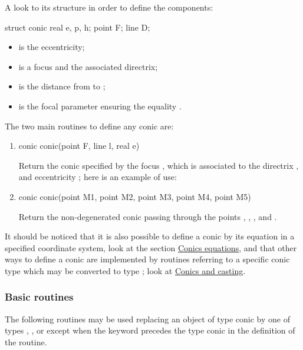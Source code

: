 \documentclass[pdftex]{article}
\begin{document}
A look to its structure in order to define the
components:
\begin{center}
  \begin{Vcolor}
    struct conic { real e, p, h; point F; line D; }
  \end{Vcolor}
\end{center}
\begin{itemize}
\item {} is the eccentricity;
\item {} is a focus and  the associated directrix;
\item {} is the distance from  to ;
\item {} is the focal parameter ensuring the equality .
\end{itemize}

The two main routines to define any conic are:

\begin{enumerate}
\item {}
  \begin{Vcolor}
    conic conic(point F, line l, real e)
  \end{Vcolor}
  Return the conic specified by the focus , which is associated to the
  directrix , and eccentricity ; here is an example of use:
\item {}
  \begin{Vcolor}
    conic conic(point M1, point M2, point M3, point M4, point M5)
  \end{Vcolor}
  Return the non-degenerated conic passing through the
  points  , , , 
  and .
\end{enumerate}
It should be noticed that it is also possible to define a conic
by its equation in a specified coordinate system, look at the section
\href{#subsection.bqe}{Conics equations}, and that other ways to
define a conic are implemented by routines referring to a specific
conic type which may be converted to type ; look at
\href{#subsubsection.castingconic}{Conics and casting}.

\subsubsection{Basic routines}
The following routines may be used replacing an object of type conic
by one of types , ,
 or  except when the keyword
 precedes the type conic in the definition of the
routine.
\end{document}
